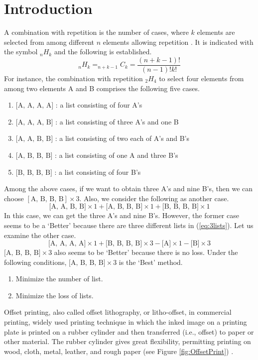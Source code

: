 \documentclass[a4paper]{amsart}
\numberwithin{equation}{section} %
\numberwithin{figure}{section} %
\numberwithin{table}{section}
\theoremstyle{plain}
\theoremstyle{definition}
\theoremstyle{plain}
\theoremstyle{plain}
\theoremstyle{plain}
\theoremstyle{plain}
\theoremstyle{plain}
\begin{document}
\section{Introduction}\label{sec:intro}
A combination with repetition is the number of cases, where $k$ elements are selected from among different $n$ elements allowing repetition \cite{Brualdi2004}. 
It is indicated with the symbol $_{n}H_{k}$ and the following is established.
\begin{equation}
	_{n}H_{k} = _{n+k-1}C_{k} = \frac{(n+k-1)!}{(n-1)!k!}
\end{equation}
For instance, the combination with repetition $_{2}H_{4}$ to select four elements from among two elements A and B comprises the following five cases.
\begin{enumerate}[(1)]
	\item $\textrm{[A, A, A, A]}$ : a list consisting of four A's
	\item $\textrm{[A, A, A, B]}$ : a list consisting of three A's and one B
	\item $\textrm{[A, A, B, B]}$ : a list consisting of two each of A's and B's
	\item $\textrm{[A, B, B, B]}$ : a list consisting of one A and three B's
	\item $\textrm{[B, B, B, B]}$ : a list consisting of four B's
\end{enumerate}
Among the above cases, if we want to obtain three A's and nine B's, then we can choose $[\textrm{A, B, B, B}] \times 3$. 
Also, we consider the following as another case.
\begin{equation}\label{eq:3lists}
	\textrm{[A, A, B, B]} \times 1 + \textrm{[A, B, B, B]} \times 1 + \textrm{[B, B, B, B]} \times 1
\end{equation}
In this case, we can get the three A's and nine B's. 
However, the former case seems to be a ‘Better’ because there are three different lists in (\ref{eq:3lists}). 
Let us examine the other case.
\begin{equation}
\textrm{[A, A, A, A]} \times 1 + \textrm{[B, B, B, B]} \times 3 - \textrm{[A]} \times 1 - \textrm{[B]} \times 3
\end{equation}
$\textrm{[A, B, B, B]} \times 3$ also seems to be `Better' because there is no loss. Under the following conditions, $\textrm{[A, B, B, B]} \times 3$ is the ‘Best’ method.
\begin{enumerate}[(1)]
	\item Minimize the number of list.
	\item Minimize the loss of lists.
\end{enumerate}
Offset printing, also called offset lithography, or litho-offset, in commercial printing, 
widely used printing technique in which the inked image on a printing plate is printed on a rubber cylinder and then transferred (i.e., offset) to paper or other material. 
The rubber cylinder gives great flexibility, permitting printing on wood, cloth, metal, leather, and rough paper (see Figure \ref{fig:OffsetPrint}) \cite{OffsetPrint}.
\end{document}
